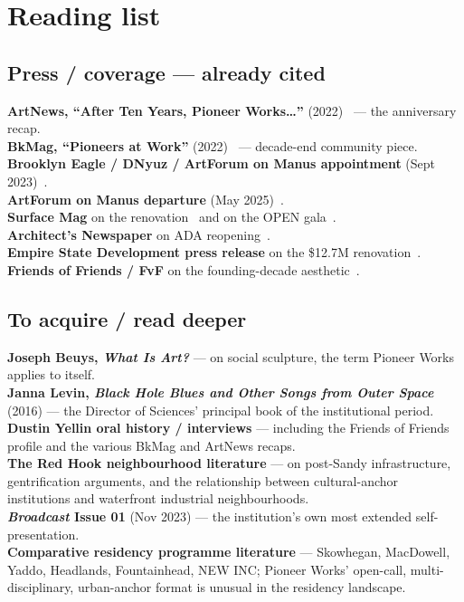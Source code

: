\documentclass[10pt,letterpaper,twocolumn]{article}
\begin{document}
\section{Reading list}

\subsection{Press / coverage --- already cited}

\textbf{ArtNews, ``After Ten Years, Pioneer Works\dots''} (2022)~\citep{artnews2022ten} --- the anniversary recap.\\
\textbf{BkMag, ``Pioneers at Work''} (2022)~\citep{bkmag2022pioneer} --- decade-end community piece.\\
\textbf{Brooklyn Eagle / DNyuz / ArtForum on Manus appointment} (Sept 2023)~\citep{artforum2023manus}.\\
\textbf{ArtForum on Manus departure} (May 2025)~\citep{artforum2025stepsdown}.\\
\textbf{Surface Mag} on the renovation~\citep{surface2024obs} and on the OPEN gala~\citep{surface2024gala}.\\
\textbf{Architect's Newspaper} on ADA reopening~\citep{archpaper2024reopen}.\\
\textbf{Empire State Development press release} on the \$12.7M renovation~\citep{esd2025renovation}.\\
\textbf{Friends of Friends / FvF} on the founding-decade aesthetic~\citep{fvf2017pioneer}.

\subsection{To acquire / read deeper}

\textbf{Joseph Beuys, \emph{What Is Art?}} --- on social sculpture, the term Pioneer Works applies to itself.\\
\textbf{Janna Levin, \emph{Black Hole Blues and Other Songs from Outer Space}} (2016) --- the Director of Sciences' principal book of the institutional period.\\
\textbf{Dustin Yellin oral history / interviews} --- including the Friends of Friends profile and the various BkMag and ArtNews recaps.\\
\textbf{The Red Hook neighbourhood literature} --- on post-Sandy infrastructure, gentrification arguments, and the relationship between cultural-anchor institutions and waterfront industrial neighbourhoods.\\
\textbf{\emph{Broadcast} Issue 01} (Nov 2023) --- the institution's own most extended self-presentation.\\
\textbf{Comparative residency programme literature} --- Skowhegan, MacDowell, Yaddo, Headlands, Fountainhead, NEW INC; Pioneer Works' open-call, multi-disciplinary, urban-anchor format is unusual in the residency landscape.
\end{document}
